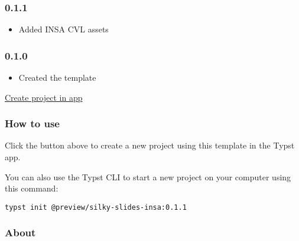 \subsubsection{0.1.1}\label{section}

\begin{itemize}
\tightlist
\item
  Added INSA CVL assets
\end{itemize}

\subsubsection{0.1.0}\label{section-1}

\begin{itemize}
\tightlist
\item
  Created the template
\end{itemize}

\href{/app?template=silky-slides-insa&version=0.1.1}{Create project in
app}

\subsubsection{How to use}\label{how-to-use}

Click the button above to create a new project using this template in
the Typst app.

You can also use the Typst CLI to start a new project on your computer
using this command:

\begin{verbatim}
typst init @preview/silky-slides-insa:0.1.1
\end{verbatim}



\subsubsection{About}\label{about}

